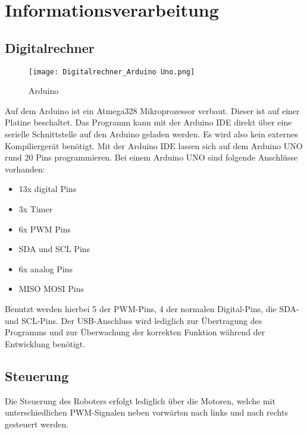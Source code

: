 \section{Informationsverarbeitung}

\subsection{Digitalrechner}
\begin{figure}[H]
    \begin{center}
    \texttt{[image: Digitalrechner\_Arduino Uno.png]}
    \end{center}
    \caption{Arduino}
\end{figure}

Auf dem Arduino ist ein Atmega328 Mikroprozessor verbaut. Dieser ist auf einer Platine beschaltet. Das Programm kann mit der Arduino IDE direkt über eine serielle Schnittstelle auf den Arduino geladen werden. Es wird also kein externes Kompiliergerät benötigt. Mit der Arduino IDE lassen sich auf dem Arduino UNO rund 20 Pins programmieren. Bei einem Arduino UNO sind folgende Anschlüsse vorhanden:

\begin{itemize}
    \item 13x digital Pins 
    \item 3x Timer 
    \item 6x PWM Pins 
    \item SDA und SCL Pins 
    \item 6x analog Pins 
    \item MISO MOSI Pins
\end{itemize}

Benutzt werden hierbei 5 der PWM-Pins, 4 der normalen Digital-Pins, die SDA- und SCL-Pins. Der USB-Anschluss wird lediglich zur Übertragung des Programms und zur Überwachung der korrekten Funktion während der Entwicklung benötigt.


\subsection{Steuerung}
Die Steuerung des Roboters erfolgt lediglich über die Motoren, welche mit unterschiedlichen PWM-Signalen neben vorwärtsn nach links und nach rechts gesteuert werden. 

